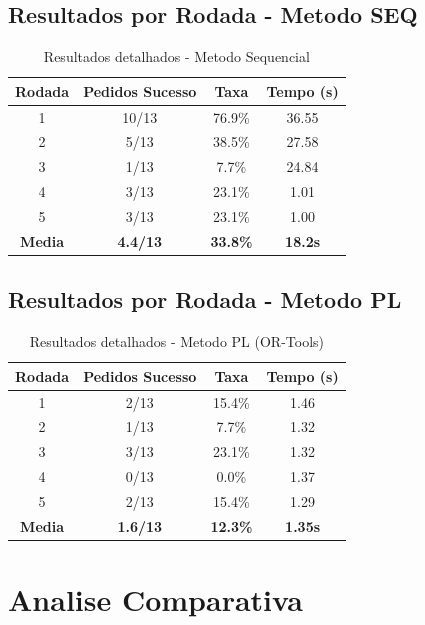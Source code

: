 \documentclass[12pt,a4paper]{article}
\begin{document}
\subsection{Resultados por Rodada - Metodo SEQ}

\begin{table}[H]
\centering
\caption{Resultados detalhados - Metodo Sequencial}
\begin{tabular}{cccc}
\toprule
\textbf{Rodada} & \textbf{Pedidos Sucesso} & \textbf{Taxa} & \textbf{Tempo (s)} \\
\midrule
1 & 10/13 & 76.9\% & 36.55 \\
2 & 5/13 & 38.5\% & 27.58 \\
3 & 1/13 & 7.7\% & 24.84 \\
4 & 3/13 & 23.1\% & 1.01 \\
5 & 3/13 & 23.1\% & 1.00 \\
\midrule
\textbf{Media} & \textbf{4.4/13} & \textbf{33.8\%} & \textbf{18.2s} \\
\bottomrule
\end{tabular}
\end{table}

\subsection{Resultados por Rodada - Metodo PL}

\begin{table}[H]
\centering
\caption{Resultados detalhados - Metodo PL (OR-Tools)}
\begin{tabular}{cccc}
\toprule
\textbf{Rodada} & \textbf{Pedidos Sucesso} & \textbf{Taxa} & \textbf{Tempo (s)} \\
\midrule
1 & 2/13 & 15.4\% & 1.46 \\
2 & 1/13 & 7.7\% & 1.32 \\
3 & 3/13 & 23.1\% & 1.32 \\
4 & 0/13 & 0.0\% & 1.37 \\
5 & 2/13 & 15.4\% & 1.29 \\
\midrule
\textbf{Media} & \textbf{1.6/13} & \textbf{12.3\%} & \textbf{1.35s} \\
\bottomrule
\end{tabular}
\end{table}

\section{Analise Comparativa}
\end{document}
